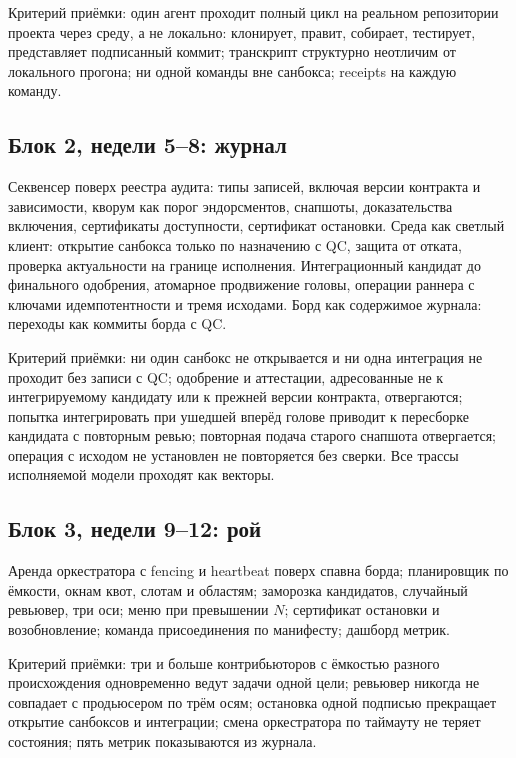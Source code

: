 Критерий приёмки: один агент проходит полный цикл на реальном репозитории проекта через среду, а не локально: клонирует, правит, собирает, тестирует, представляет подписанный коммит; транскрипт структурно неотличим от локального прогона; ни одной команды вне санбокса; receipts на каждую команду.

\subsection{Блок 2, недели 5--8: журнал}

Секвенсер поверх реестра аудита: типы записей, включая версии контракта и зависимости, кворум как порог эндорсментов, снапшоты, доказательства включения, сертификаты доступности, сертификат остановки. Среда как светлый клиент: открытие санбокса только по назначению с QC, защита от отката, проверка актуальности на границе исполнения. Интеграционный кандидат до финального одобрения, атомарное продвижение головы, операции раннера с ключами идемпотентности и тремя исходами. Борд как содержимое журнала: переходы как коммиты борда с QC.

Критерий приёмки: ни один санбокс не открывается и ни одна интеграция не проходит без записи с QC; одобрение и аттестации, адресованные не к интегрируемому кандидату или к прежней версии контракта, отвергаются; попытка интегрировать при ушедшей вперёд голове приводит к пересборке кандидата с повторным ревью; повторная подача старого снапшота отвергается; операция с исходом не установлен не повторяется без сверки. Все трассы исполняемой модели проходят как векторы.

\subsection{Блок 3, недели 9--12: рой}

Аренда оркестратора с fencing и heartbeat поверх спавна борда; планировщик по ёмкости, окнам квот, слотам и областям; заморозка кандидатов, случайный ревьювер, три оси; меню при превышении $N$; сертификат остановки и возобновление; команда присоединения по манифесту; дашборд метрик.

Критерий приёмки: три и больше контрибьюторов с ёмкостью разного происхождения одновременно ведут задачи одной цели; ревьювер никогда не совпадает с продьюсером по трём осям; остановка одной подписью прекращает открытие санбоксов и интеграции; смена оркестратора по таймауту не теряет состояния; пять метрик показываются из журнала.


